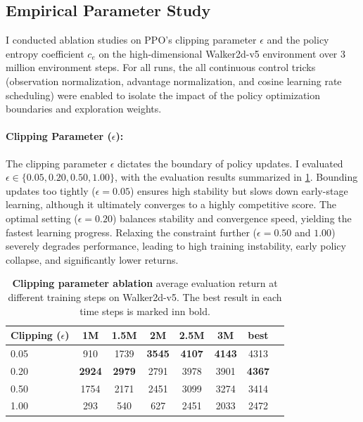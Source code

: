 \documentclass[10pt,twocolumn,letterpaper]{article}
\begin{document}
\subsection{Empirical Parameter Study}
\label{subsec:param_study}

I conducted ablation studies on PPO's clipping parameter $\epsilon$ and the policy
entropy coefficient $c_e$ on the high-dimensional Walker2d-v5 environment
over 3 million environment steps. For all runs, the all continuous control tricks
(observation normalization, advantage normalization, and cosine learning rate
scheduling) were enabled to isolate the impact of the policy optimization
boundaries and exploration weights.

\paragraph{Clipping Parameter ($\epsilon$):}
The clipping parameter $\epsilon$ dictates the boundary of policy updates. I evaluated $\epsilon \in \{0.05, 0.20, 0.50, 1.00\}$, with the evaluation results summarized in \cref{tab:param_study_clip}. Bounding updates too tightly ($\epsilon = 0.05$) ensures high stability but slows down early-stage learning, although it ultimately converges to a highly competitive score. The optimal setting ($\epsilon = 0.20$) balances stability and convergence speed, yielding the fastest learning progress. Relaxing the constraint further ($\epsilon = 0.50$ and $1.00$) severely degrades performance, leading to high training instability, early policy collapse, and significantly lower returns.

\begin{table}[H]
  \centering
  \setlength{\tabcolsep}{4.5pt}
  \begin{tabular}{@{}lccccccc@{}}
    \toprule
    \textbf{Clipping ($\epsilon$)} & \textbf{1M}   & \textbf{1.5M} & \textbf{2M}   & \textbf{2.5M} & \textbf{3M}   & \textbf{best} \\
    \midrule
    0.05                           & 910           & 1739          & \textbf{3545} & \textbf{4107} & \textbf{4143} & 4313 \\
    0.20                           & \textbf{2924} & \textbf{2979} & 2791          & 3978          & 3901          & \textbf{4367} \\
    0.50                           & 1754          & 2171          & 2451          & 3099          & 3274          & 3414          \\
    1.00                           & 293           & 540           & 627           & 2451          & 2033          & 2472          \\
    \bottomrule
  \end{tabular}
  \caption{\textbf{Clipping parameter ablation} average evaluation return at
    different training steps on Walker2d-v5. The best result in each time steps
    is marked inn bold.}
  \label{tab:param_study_clip}
\end{table}
\end{document}
